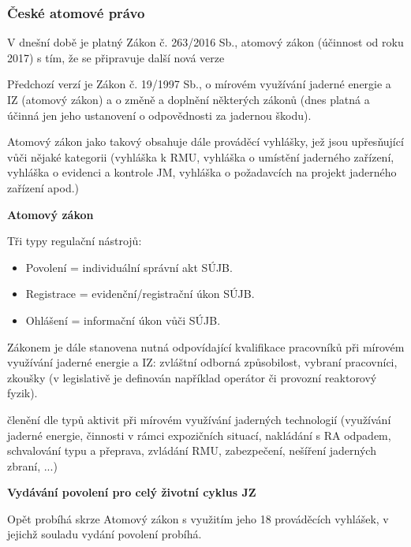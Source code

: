 \subsubsection{České atomové právo}

V dnešní době je platný Zákon č. 263/2016 Sb., atomový zákon (účinnost od roku 2017) s tím, že se připravuje další nová verze 

Předchozí verzí je Zákon č. 19/1997 Sb., o mírovém využívání jaderné energie a IZ (atomový zákon) a o změně a doplnění některých zákonů (dnes platná a účinná jen jeho ustanovení o odpovědnosti za jadernou škodu).

Atomový zákon jako takový obsahuje dále prováděcí vyhlášky, jež jsou upřesňující vůči nějaké kategorii (vyhláška k RMU, vyhláška o umístění jaderného zařízení, vyhláška o evidenci a kontrole JM, vyhláška o požadavcích na projekt jaderného zařízení apod.)

\textbf{Atomový zákon}

Tři typy regulační nástrojů:

\begin{itemize}
	\item Povolení = individuální správní akt SÚJB.
	\item Registrace = evidenční/registrační úkon SÚJB.
	\item Ohlášení = informační úkon vůči SÚJB.
\end{itemize}

Zákonem je dále stanovena nutná odpovídající kvalifikace pracovníků při mírovém využívání jaderné energie a IZ: zvláštní odborná způsobilost, vybraní pracovníci, zkoušky (v legislativě je definován například operátor či provozní reaktorový fyzik).

členění dle typů aktivit při mírovém využívání jaderných technologií (využívání jaderné energie, činnosti v rámci expozičních situací, nakládání s RA odpadem, schvalování typu a přeprava, zvládání RMU, zabezpečení, nešíření jaderných zbraní, ...)

\textbf{Vydávání povolení pro celý životní cyklus JZ} 

Opět probíhá skrze Atomový zákon s využitím jeho 18 prováděcích vyhlášek, v jejichž souladu vydání povolení probíhá.

